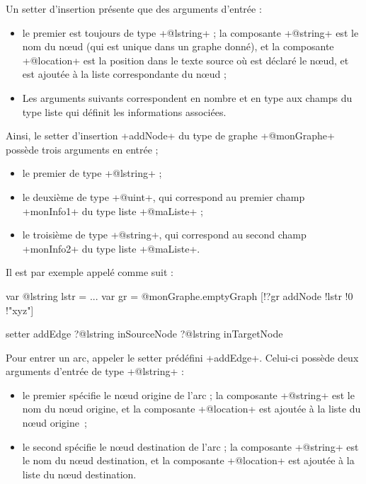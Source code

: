 Un setter d'insertion présente que des arguments d'entrée :
\begin{itemize}
  \item le premier est toujours de type \ggs+@lstring+ ; la composante \ggs+@string+ est le nom du nœud (qui est unique dans un graphe donné), et la composante \ggs+@location+ est la position dans le texte source où est déclaré le nœud, et est ajoutée à la liste correspondante du nœud ;
  \item Les arguments suivants correspondent en nombre et en type aux champs du type liste qui définit les informations associées.
\end{itemize}

Ainsi, le setter d'insertion \ggs+addNode+ du type de graphe \ggs+@monGraphe+ possède trois arguments en entrée ;
\begin{itemize}
  \item le premier de type \ggs+@lstring+ ;
  \item le deuxième de type \ggs+@uint+, qui correspond au premier champ \ggs+monInfo1+ du type liste \ggs+@maListe+ ;
  \item le troisième de type \ggs+@string+, qui correspond au second champ \ggs+monInfo2+ du type liste \ggs+@maListe+.
\end{itemize}

Il est par exemple appelé comme suit :
\begin{galgas}
var @lstring lstr = ... 
var gr = @monGraphe.emptyGraph 
[!?gr addNode !lstr !0 !"xyz"] 
\end{galgas}





\begin{galgas}
setter addEdge ?@lstring inSourceNode ?@lstring inTargetNode 
\end{galgas}

Pour entrer un arc, appeler le setter prédéfini \ggs+addEdge+. Celui-ci possède deux arguments d'entrée de type \ggs+@lstring+ :
\begin{itemize}
  \item le premier spécifie le nœud origine de l'arc ; la composante \ggs+@string+ est le nom du nœud origine, et la composante \ggs+@location+ est ajoutée à la liste du nœud origine~;
  \item le second spécifie le nœud destination de l'arc ; la composante \ggs+@string+ est le nom du nœud destination, et la composante \ggs+@location+ est ajoutée à la liste du nœud destination.
\end{itemize}








